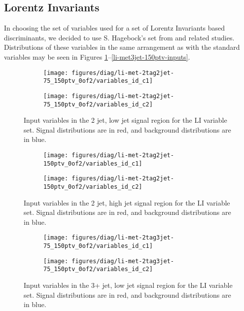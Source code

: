 \subsection{Lorentz Invariants}
In choosing the set of variables used for a set of Lorentz Invariants based discriminants, we decided to use S. Hagebock's set from \cite{litalk} and related studies.  Distributions of these variables in the same arrangement as with the standard variables may be seen in Figures \ref{fig:li-met2jet-75_150ptv-inputs}--\ref{li-met3jet-150ptv-inputs}.


\begin{figure}[!htbp]\captionsetup{justification=centering}
  \centering
\begin{subfigure}[t]{0.49\textwidth}\centering\texttt{[image: figures/diag/li-met-2tag2jet-75\_150ptv\_0of2/variables\_id\_c1]}\end{subfigure}
\begin{subfigure}[t]{0.49\textwidth}\centering\texttt{[image: figures/diag/li-met-2tag2jet-75\_150ptv\_0of2/variables\_id\_c2]}\end{subfigure}
  \caption{Input variables in the 2 jet, low jet signal region for the LI variable set.  Signal distributions are in red, and background distributions are in blue.}
  \label{fig:li-met2jet-75_150ptv-inputs}
\end{figure}

\begin{figure}[!htbp]\captionsetup{justification=centering}
  \centering
\begin{subfigure}[t]{0.49\textwidth}\centering\texttt{[image: figures/diag/li-met-2tag2jet-150ptv\_0of2/variables\_id\_c1]}\end{subfigure}
\begin{subfigure}[t]{0.49\textwidth}\centering\texttt{[image: figures/diag/li-met-2tag2jet-150ptv\_0of2/variables\_id\_c2]}\end{subfigure}
  \caption{Input variables in the 2 jet, high jet signal region for the LI variable set.  Signal distributions are in red, and background distributions are in blue.}
  \label{fig:li-met2jet-150ptv-inputs}
\end{figure}

\begin{figure}[!htbp]\captionsetup{justification=centering}
  \centering
\begin{subfigure}[t]{0.49\textwidth}\centering\texttt{[image: figures/diag/li-met-2tag3jet-75\_150ptv\_0of2/variables\_id\_c1]}\end{subfigure}
\begin{subfigure}[t]{0.49\textwidth}\centering\texttt{[image: figures/diag/li-met-2tag3jet-75\_150ptv\_0of2/variables\_id\_c2]}\end{subfigure}
  \caption{Input variables in the 3+ jet, low jet signal region for the LI variable set.  Signal distributions are in red, and background distributions are in blue.}
  \label{fig:li-met3jet-75_150ptv-inputs}
\end{figure}

